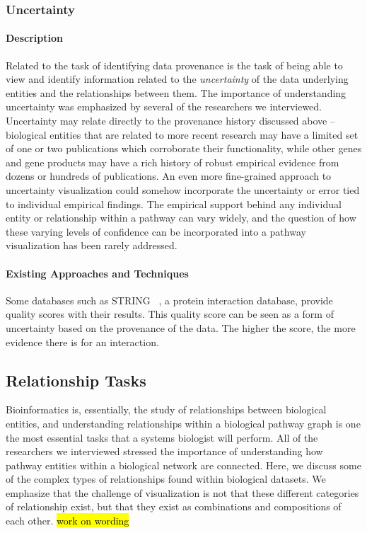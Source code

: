 \subsubsection*{Uncertainty}

\paragraph*{Description}
Related to the task of identifying data provenance is the task of being able to view and identify information related to the \textit{uncertainty} of the data underlying entities and the relationships between them.
The importance of understanding uncertainty was emphasized by several of the researchers we interviewed.
Uncertainty may relate directly to the provenance history discussed above -- biological entities that are related to more recent research may have a limited set of one or two publications which corroborate their functionality, while other genes and gene products may have a rich history of robust empirical evidence from dozens or hundreds of publications.
An even more fine-grained approach to uncertainty visualization could somehow incorporate the uncertainty or error tied to individual empirical findings.
The empirical support behind any individual entity or relationship within a pathway can vary widely, and the question of how these varying levels of confidence can be incorporated into a pathway visualization has been rarely addressed.

\paragraph*{Existing Approaches and Techniques}
Some databases such as STRING~\cite{STRING2005} , a protein interaction database, provide quality scores with their results. This quality score can be seen as a form of uncertainty based on the provenance of the data.
The higher the score, the more evidence there is for an interaction.

\subsection*{Relationship Tasks}
Bioinformatics is, essentially, the study of relationships between biological entities, and understanding relationships within a biological pathway graph is one the most essential tasks that a systems biologist will perform.
All of the researchers we interviewed stressed the importance of understanding how pathway entities within a biological network are connected.
Here, we discuss some of the complex types of relationships found within biological datasets.
We emphasize that the challenge of visualization is not that these different categories of relationship exist, but that they exist as combinations and compositions of each other. \hl{work on wording}

